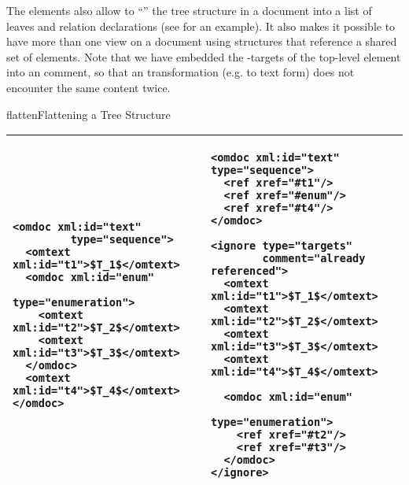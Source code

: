 \begin{omgroup}[id=omdoc-infrastructure,short=Document Infrastructure]
\begin{module}[id=sharing]
\begin{omgroup}[id=sharing,short=Sharing Document Parts]
The {} elements also allow to ``{}'' the tree
structure in a document into a list of leaves and relation declarations (see
{} for an example). It also makes it possible to have more than
one view on a document using {} structures that reference a
shared set of {\omdoc} elements. Note that we have embedded the
{}-targets of the top-level {} element into an
{} comment, so that an {\omdoc} transformation (e.g. to text form)
does not encounter the same content twice.

\begin{myfig}{flatten}{Flattening a Tree Structure}
\begin{tabular}{|p{5.1cm}|p{5.5cm}|}\hline
\begin{lstlisting}
<omdoc xml:id="text" 
         type="sequence">
  <omtext xml:id="t1">$T_1$</omtext>
  <omdoc xml:id="enum" 
            type="enumeration">
    <omtext xml:id="t2">$T_2$</omtext>
    <omtext xml:id="t3">$T_3$</omtext>
  </omdoc>
  <omtext xml:id="t4">$T_4$</omtext>
</omdoc>
\end{lstlisting}
& 
\begin{lstlisting}
<omdoc xml:id="text" type="sequence">
  <ref xref="#t1"/>
  <ref xref="#enum"/>
  <ref xref="#t4"/>
</omdoc>

<ignore type="targets"
        comment="already referenced"> 
  <omtext xml:id="t1">$T_1$</omtext>
  <omtext xml:id="t2">$T_2$</omtext>
  <omtext xml:id="t3">$T_3$</omtext>
  <omtext xml:id="t4">$T_4$</omtext>

  <omdoc xml:id="enum" 
           type="enumeration">
    <ref xref="#t2"/>
    <ref xref="#t3"/>
  </omdoc>
</ignore>
\end{lstlisting}\\\hline
\end{tabular}
\end{myfig}


\end{omgroup}
\end{module}
\end{omgroup}
